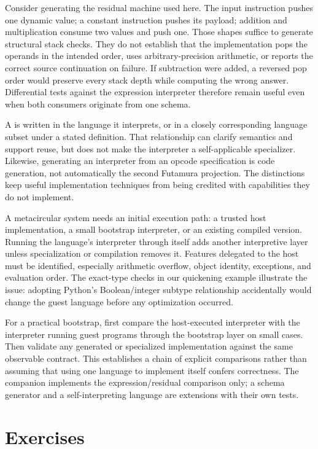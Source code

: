 Consider generating the residual machine used here.
The input instruction pushes one dynamic value; a constant instruction pushes its payload; addition and multiplication consume two values and push one.
Those shapes suffice to generate structural stack checks.
They do not establish that the implementation pops the operands in the intended order, uses arbitrary-precision arithmetic, or reports the correct source continuation on failure.
If subtraction were added, a reversed pop order would preserve every stack depth while computing the wrong answer.
Differential tests against the expression interpreter therefore remain useful even when both consumers originate from one schema.

A  is written in the language it interprets, or in a closely corresponding language subset under a stated definition.
That relationship can clarify semantics and support reuse, but does not make the interpreter a self-applicable specializer.
Likewise, generating an interpreter from an opcode specification is code generation, not automatically the second Futamura projection.
The distinctions keep useful implementation techniques from being credited with capabilities they do not implement.

A metacircular system needs an initial execution path: a trusted host implementation, a small bootstrap interpreter, or an existing compiled version.
Running the language's interpreter through itself adds another interpretive layer unless specialization or compilation removes it.
Features delegated to the host must be identified, especially arithmetic overflow, object identity, exceptions, and evaluation order.
The exact-type checks in our quickening example illustrate the issue: adopting Python's Boolean/integer subtype relationship accidentally would change the guest language before any optimization occurred.

For a practical bootstrap, first compare the host-executed interpreter with the interpreter running guest programs through the bootstrap layer on small cases.
Then validate any generated or specialized implementation against the same observable contract.
This establishes a chain of explicit comparisons rather than assuming that using one language to implement itself confers correctness.
The companion implements the expression/residual comparison only; a schema generator and a self-interpreting language are extensions with their own tests.

\section{Exercises}
\label{sec:ch65-exercises}

